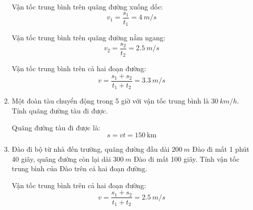 \begin{enumerate}[label=\bfseries Câu \arabic*:]
	\hideall
	{Vận tốc trung bình trên quãng đường xuống dốc:
		$$v_1 = \dfrac{s_1}{t_1} = \SI{4}{m/s}$$
		
		Vận tốc trung bình trên quãng đường nằm ngang:
		$$v_2 = \dfrac{s_2}{t_2} = \SI{2.5}{m/s}$$
		
		Vận tốc trung bình trên cả hai đoạn đường:
		$$v= \dfrac{s_1 + s_2}{t_1 + t_2} = \SI{3.3}{m/s}$$
	}
	\item {}
	
	
	{Một đoàn tàu chuyển động trong 5 giờ với vận tốc trung bình là $\SI{30}{km/h}$. Tính quãng đường tàu đi được.
	}
	
	\hideall
	{Quãng đường tàu đi được là:
		$$s=vt=150\ \text{km}$$
	}
	\item {}
	
	
	{Đào đi bộ từ nhà đến trường, quãng đường đầu dài $\SI{200}{m}$ Đào đi mất 1 phút 40 giây, quãng đường còn lại dài $\SI{300}{m}$ Đào đi mất 100 giây. Tính vận tốc trung bình của Đào trên cả hai đoạn đường.
	}
	
	\hideall
	{
		Vận tốc trung bình trên cả hai đoạn đường:
		$$v= \dfrac{s_1 + s_2}{t_1 + t_2} = \SI{2.5}{m/s}$$
	}
\end{enumerate}
